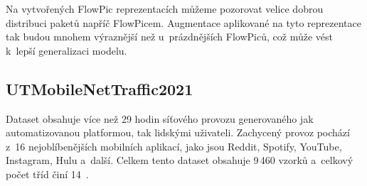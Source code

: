 Na vytvořených FlowPic reprezentacích můžeme pozorovat velice dobrou distribuci paketů napříč FlowPicem. Augmentace aplikované na tyto reprezentace tak budou mnohem výraznější než u~prázdnějších FlowPiců, což může vést k~lepší generalizaci modelu.

\subsection{UTMobileNetTraffic2021}
Dataset obsahuje více než 29 hodin síťového provozu generovaného jak automatizovanou platformou, tak lidskými uživateli. Zachycený provoz pochází z~16 nejoblíbenějších mobilních aplikací, jako jsou Reddit, Spotify, YouTube, Instagram, Hulu a~další. Celkem tento dataset obsahuje 9\,460 vzorků a~celkový počet tříd činí 14~\cite{UTMobileNetTraffic}.

\begin{table}[H]
    \centering
    \caption{Analýza datové sady UTMobileNetTraffic2021 bez filtru.}
    \label{utmob_no_filter}
\end{table}

